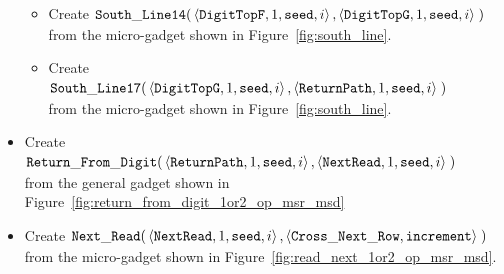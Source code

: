 \begin{itemize}
\begin{itemize}
        \item Create
        $\begin{aligned}[t]
            {\tt South\_Line14}(& \left\langle {\tt DigitTopF}, 1, {\tt seed}, i\right\rangle,
                                  \left\langle {\tt DigitTopG}, 1, {\tt seed}, i\right\rangle \;)
        \end{aligned}$\\ from the micro-gadget shown in Figure~\ref{fig:south_line}.

        \item Create
        $\begin{aligned}[t]
            {\tt South\_Line17}(& \left\langle {\tt DigitTopG}, 1, {\tt seed}, i \right\rangle,
                                  \left\langle {\tt ReturnPath},     1, {\tt seed}, i  \right\rangle \;)
        \end{aligned}$\\from the micro-gadget shown in Figure~\ref{fig:south_line}.
    \end{itemize}

    \item Create
    $\begin{aligned}[t]
            {\tt Return\_From\_Digit}(&\left\langle {\tt ReturnPath},    1, {\tt seed}, i \right\rangle,
                              \left\langle {\tt NextRead}, 1, {\tt seed}, i \right\rangle \;)
    \end{aligned}$\\from the general gadget shown in Figure~\ref{fig:return_from_digit_1or2_op_msr_msd}


    \item Create
    $\begin{aligned}[t]
        {\tt Next\_Read}(& \left\langle {\tt NextRead}, 1,      {\tt seed}, i  \right\rangle,
                    \left\langle {\tt Cross\_Next\_Row}, {\tt increment}\right\rangle \;)
    \end{aligned}$\\from the micro-gadget shown in Figure~\ref{fig:read_next_1or2_op_msr_msd}.
\end{itemize}



